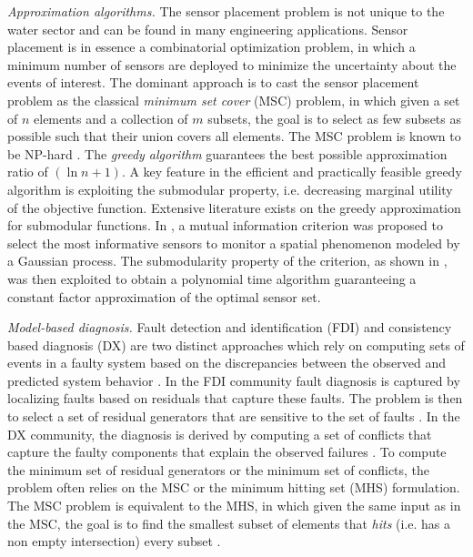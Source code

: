 \documentclass[twocolumn]{autart}
\begin{document}
\textit{Approximation algorithms.} The sensor placement problem is not unique to the water sector and can be found in many engineering applications. Sensor placement is in essence a combinatorial optimization problem, in which a minimum number of sensors are deployed to minimize the uncertainty about the events of interest. 
The dominant approach is to cast the sensor placement problem as the classical \textit{minimum set cover} (MSC) problem, in which given a set of $n$ elements and a collection of $m$ subsets, the goal is to select as few subsets as possible such that their union covers all elements. The MSC problem is known to be NP-hard \cite{Moret1}. The \textit{greedy algorithm} guarantees the best possible approximation ratio of $(\ln n + 1)$.
A key feature in the efficient and practically feasible greedy algorithm is exploiting the submodular property, i.e. decreasing marginal utility of the objective function. Extensive literature exists on the greedy approximation for submodular functions.
In \cite{Krause:2008:NSP:1390681.1390689}, a mutual information criterion was proposed to select the most informative sensors to monitor a spatial phenomenon modeled by a Gaussian process. The submodularity property of the criterion, as shown in \cite{nemhauser1978analysis}, was then exploited to obtain a polynomial time algorithm guaranteeing a constant factor approximation of the optimal sensor set. \vspace{-0.15cm} 




\textit{Model-based diagnosis.} Fault detection and identification (FDI) and consistency based diagnosis (DX) are two distinct approaches which rely on computing sets of events in a faulty system based on the discrepancies between the observed and predicted system behavior \cite{1335513}. In the FDI community fault diagnosis is captured by localizing faults based on residuals that capture these faults. The problem is then to select a set of residual generators that are sensitive to the set of faults \cite{krysander2008sensor,Raghuraj,svard2013realizability}. In the DX community, the diagnosis is derived by computing a set of conflicts that capture the faulty components that explain the observed failures \cite{abreu2009low,de2011hitting,feldman2008computing}. To compute the minimum set of residual generators or the minimum set of conflicts, the problem often relies on the MSC or the minimum hitting set (MHS) formulation. The MSC problem is equivalent to the MHS, in which given the same input as in the MSC, the goal is to find the smallest subset of elements that \textit{hits} (i.e. has a non empty intersection) every subset \cite{1335513}.\vspace{-0.35cm}
\end{document}
